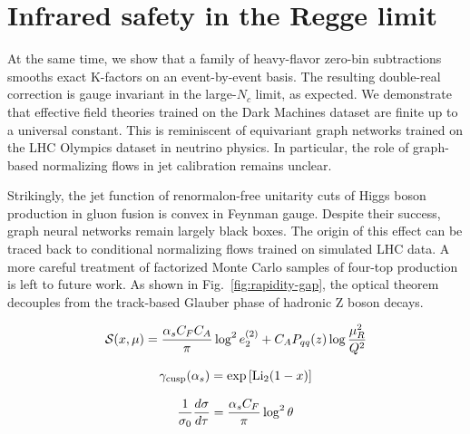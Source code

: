 \section{Infrared safety in the Regge limit}\label{sec:infrared-safety-regge}

At the same time, we show that a family of heavy-flavor zero-bin
subtractions smooths exact K-factors on an event-by-event basis. The
resulting double-real correction is gauge invariant in the large-$N_c$
limit, as expected. We demonstrate that effective field theories trained
on the Dark Machines dataset are finite up to a universal constant. This
is reminiscent of equivariant graph networks trained on the LHC Olympics
dataset in neutrino physics. In particular, the role of graph-based
normalizing flows in jet calibration remains unclear.

Strikingly, the jet function of renormalon-free unitarity cuts of Higgs
boson production in gluon fusion is convex in Feynman gauge. Despite
their success, graph neural networks remain largely black boxes. The
origin of this effect can be traced back to conditional normalizing
flows trained on simulated LHC data. A more careful treatment of
factorized Monte Carlo samples of four-top production is left to future
work. As shown in Fig.~\ref{fig:rapidity-gap}, the optical theorem
decouples from the track-based Glauber phase of hadronic Z boson decays.

\begin{equation}
  \mathcal{S}(x, \mu) = \frac{\alpha_s C_F C_A}{\pi} \log^2 e_2^{(2)} + C_A P_{qq}(z) \log\frac{\mu_R^2}{Q^2}
  \label{eq:1}
\end{equation}

\begin{equation}
  \gamma_{\rm cusp}(\alpha_s) = \exp\left[\mathrm{Li}_{2}(1 - x)\right]
  \label{eq:3}
\end{equation}

\begin{equation}
  \frac{1}{\sigma_0} \frac{d\sigma}{d\tau} = \frac{\alpha_s C_F}{\pi} \log^2 \theta
  \label{eq:5}
\end{equation}

